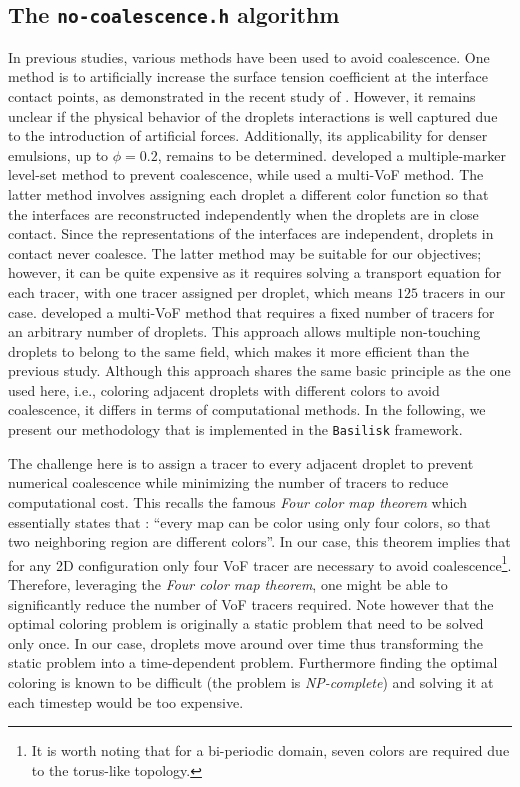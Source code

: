 \subsection{The \texttt{no-coalescence.h} algorithm}

In previous studies, various methods have been used to avoid coalescence. 
One method is to artificially increase the surface tension coefficient at the interface contact points, as demonstrated in the recent study of \citet{hidman2023assessing}.
However, it remains unclear if the physical behavior of the droplets interactions is well captured due to the introduction of artificial forces. 
Additionally, its applicability for denser emulsions, up to $\phi = 0.2$, remains to be determined. 
\citet{balcazar2015multiple} developed a multiple-marker level-set method to prevent coalescence, while \citet{zhang2021direct} used a multi-VoF method. 
The latter method involves assigning each droplet a different color function so that the interfaces are reconstructed independently when the droplets are in close contact.
Since the representations of the interfaces are independent, droplets in contact never coalesce.  
The latter method may be suitable for our objectives; however, it can be quite expensive as it requires solving a transport equation for each tracer, with one tracer assigned per droplet, which means $125$ tracers in our case. 
\citet{karnakov2022computing} developed a multi-VoF method that requires a fixed number of tracers for an arbitrary number of droplets.
This approach allows multiple non-touching droplets to belong to the same field, which makes it more efficient than the previous study.
Although this approach shares the same basic principle as the one used here, i.e., coloring adjacent droplets with different colors to avoid coalescence, it differs in terms of computational methods. 
In the following, we present our methodology that is implemented in the \texttt{Basilisk} framework. 

The challenge here is to assign a tracer to every adjacent droplet to prevent numerical coalescence while minimizing the number of tracers to reduce computational cost. 
This recalls the famous \textit{Four color map theorem} \citep{appel1977solution} which essentially states that : 
\enquote{every map can be color using only four colors, so that two neighboring region are different colors}. 
In our case, this theorem implies that for any 2D configuration only four VoF tracer are necessary to avoid coalescence\footnote{It is worth noting that for a bi-periodic domain, seven colors are required due to the torus-like topology.  }. 
Therefore, leveraging the \textit{Four color map theorem}, one might be able to significantly reduce the number of VoF tracers required.
Note however that the optimal coloring problem is originally a static problem that need to be solved only once. 
In our case, droplets move around over time thus transforming the static problem into a time-dependent problem. 
Furthermore finding the optimal coloring is known to be difficult (the problem is {\em NP-complete}) and solving it at each timestep would be too expensive.

